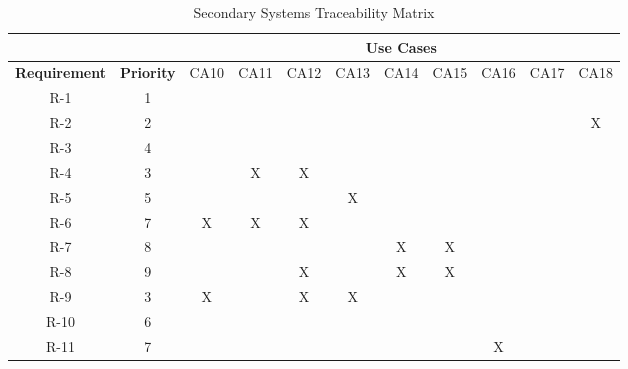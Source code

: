 \documentclass[12pt,a4paper]{article}
\begin{document}
			\begin{table}[]
				\centering
				\caption{Secondary Systems Traceability Matrix}
				\label{my-label}
				\begin{adjustwidth}{-2cm}{}
					\begin{tabular}{cc|c|c|c|c|c|c|c|c|c|}
						\cline{3-11}
						                                           &                   & \multicolumn{9}{c|}{\textbf{Use Cases}} 				     		  \\ \hline
						\multicolumn{1}{|c|}{\textbf{Requirement}} & \textbf{Priority} & CA10 & CA11  & CA12  & CA13  & CA14  & CA15 & CA16 & CA17 & CA18      \\ \hline
						\multicolumn{1}{|c|}{R-1}                 & 1                 &      &     &     &      &     &   &   &   &   				  			\\ \hline
						\multicolumn{1}{|c|}{R-2}                 & 2                 &      &     &     &      &     &   &   &   & X  				   			\\ \hline
						\multicolumn{1}{|c|}{R-3}                 & 4                 &      &     &     &      &     &   &   &   &     						\\ \hline
						\multicolumn{1}{|c|}{R-4}                 & 3                 &      & X   & X   &      &     &   &   &   &      						\\ \hline
						\multicolumn{1}{|c|}{R-5}                 & 5                 &      &     &     & X    &     &   &   &   &    						    \\ \hline
						\multicolumn{1}{|c|}{R-6}                 & 7                 & X    & X   & X   &      &     &   &   &   &    						    \\ \hline
						\multicolumn{1}{|c|}{R-7}                 & 8                 &      &     &     &      & X   & X &   &   &     						\\ \hline
						\multicolumn{1}{|c|}{R-8}                 & 9                 &      &     & X   &      & X   & X &   &   &     						\\ \hline
						\multicolumn{1}{|c|}{R-9}                 & 3                 & X    &     & X   & X    &     &   &   &   &     						\\ \hline
						\multicolumn{1}{|c|}{R-10}                 & 6                 &     &     &     &      &     &   &   &   &    						    \\ \hline
						\multicolumn{1}{|c|}{R-11}                 & 7                 &     &     &     &      &     &   & X &   &     						\\ \hline

\end{tabular}
\end{adjustwidth}
\end{table}
\end{document}
